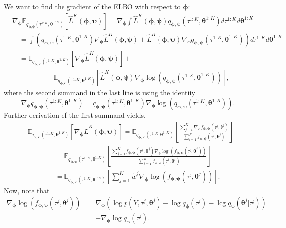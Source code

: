 \documentclass{article}
\newcommand{\bParam}{\bm{\theta}}
\newcommand{\E}{\mathbb{E}}
\begin{document}
We want to find the gradient of the ELBO with respect to $\bm{\phi}$:
\begin{align*}
    & \nabla_{\bm{\phi}} \E_{q_{\bm{\phi}, \bm{\psi}}(\tau^{1:K},\bParam^{1:K})}[\hat{L}^K(\bm{\phi}, \bm{\psi})] = \nabla_{\bm{\phi}} \int \hat{L}^K(\bm{\phi}, \bm{\psi}) q_{\bm{\phi}, \bm{\psi}}(\tau^{1:K}, \bParam^{1:K}) d\tau^{1:K} d\bParam^{1:K} \\
    & \quad = \int \left( q_{\bm{\phi}, \bm{\psi}}(\tau^{1:K}, \bParam^{1:K}) \nabla_{\bm{\phi}} \hat{L}^K(\bm{\phi}, \bm{\psi}) + \hat{L}^K(\bm{\phi}, \bm{\psi}) \nabla_{\bm{\phi}} q_{\bm{\phi}, \bm{\psi}}(\tau^{1:K}, \bParam^{1:K}) \right) d\tau^{1:K} d\bParam^{1:K} \\
    & \quad = \E_{q_{\bm{\phi}, \bm{\psi}}(\tau^{1:K}, \bParam^{1:K})}[\nabla_{\bm{\phi}} \hat{L}^K(\bm{\phi}, \bm{\psi})] + \\
    & \qquad \qquad \qquad \E_{q_{\bm{\phi}, \bm{\psi}}(\tau^{1:K}, \bParam^{1:K})}[\hat{L}^K(\bm{\phi}, \bm{\psi}) \nabla_{\bm{\phi}} \log(q_{\bm{\phi}, \bm{\psi}}(\tau^{1:K}, \bParam^{1:K}))],
\end{align*}
where the second summand in the last line is using the identity
\[ \nabla_{\bm{\phi}} q_{\bm{\phi}, \bm{\psi}}(\tau^{1:K}, \bParam^{1:K}) = q_{\bm{\phi}, \bm{\psi}}(\tau^{1:K}, \bParam^{1:K}) \nabla_{\bm{\phi}} \log(q_{\bm{\phi}, \bm{\psi}}(\tau^{1:K}, \bParam^{1:K})). \]
Further derivation of the first summand yields,
\begin{align}
    & \E_{q_{\bm{\phi}, \bm{\psi}}(\tau^{1:K}, \bParam^{1:K})}[\nabla_{\bm{\phi}} \hat{L}^K(\bm{\phi}, \bm{\psi})] = \E_{q_{\bm{\phi}, \bm{\psi}}(\tau^{1:K}, \bParam^{1:K})}\left[\frac{\sum\limits_{j=1}^{K} \nabla_{\bm{\phi}} f_{\bm{\phi}, \bm{\psi}}(\tau^j, \bParam^j)}{\sum\limits_{i=1}^{K} f_{\bm{\phi}, \bm{\psi}}(\tau^i, \bParam^i)}\right] \nonumber \\
    & \qquad \qquad = \E_{q_{\bm{\phi}, \bm{\psi}}(\tau^{1:K}, \bParam^{1:K})}\left[\frac{\sum\limits_{j=1}^{K} f_{\bm{\phi}, \bm{\psi}}(\tau^j, \bParam^j) \nabla_{\bm{\phi}} \log(f_{\bm{\phi}, \bm{\psi}}(\tau^j, \bParam^j))}{\sum\limits_{i=1}^{K} f_{\bm{\phi}, \bm{\psi}}(\tau^i, \bParam^i)}\right] \nonumber \\
    & \qquad \qquad = \E_{q_{\bm{\phi}, \bm{\psi}}(\tau^{1:K}, \bParam^{1:K})}\left[\sum\limits_{j=1}^{K} \tilde{w}^j \nabla_{\bm{\phi}} \log(f_{\bm{\phi}, \bm{\psi}}(\tau^j, \bParam^j))\right]. \label{eq:presummand1}
\end{align}
Now, note that
\begin{align*}
    \nabla_{\bm{\phi}} \log(f_{\bm{\phi}, \bm{\psi}}(\tau^j, \bParam^j)) &= \nabla_{\bm{\phi}} (\log p(Y, \tau^j, \bParam^j) - \log q_{\bm{\phi}}(\tau^j) - \log q_{\bm{\psi}}(\bParam^j | \tau^j)) \\
    &= - \nabla_{\bm{\phi}} \log q_{\bm{\phi}}(\tau^j).
\end{align*}
\end{document}
